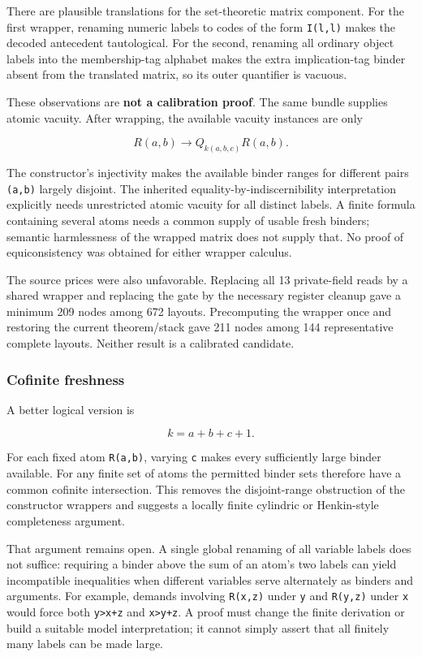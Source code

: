 \documentclass[
  11pt,
]{article}
\begin{document}
There are plausible translations for the set-theoretic matrix component.
For the first wrapper, renaming numeric labels to codes of the form
\texttt{I(l,l)} makes the decoded antecedent tautological. For the
second, renaming all ordinary object labels into the membership-tag
alphabet makes the extra implication-tag binder absent from the
translated matrix, so its outer quantifier is vacuous.

These observations are \textbf{not a calibration proof}. The same bundle
supplies atomic vacuity. After wrapping, the available vacuity instances
are only

\[
R(a,b)\to Q_{k(a,b,c)}R(a,b).
\]

The constructor's injectivity makes the available binder ranges for
different pairs \texttt{(a,b)} largely disjoint. The inherited
equality-by-indiscernibility interpretation explicitly needs
unrestricted atomic vacuity for all distinct labels. A finite formula
containing several atoms needs a common supply of usable fresh binders;
semantic harmlessness of the wrapped matrix does not supply that. No
proof of equiconsistency was obtained for either wrapper calculus.

The source prices were also unfavorable. Replacing all 13 private-field
reads by a shared wrapper and replacing the gate by the necessary
register cleanup gave a minimum 209 nodes among 672 layouts.
Precomputing the wrapper once and restoring the current theorem/stack
gave 211 nodes among 144 representative complete layouts. Neither result
is a calibrated candidate.

\hypertarget{cofinite-freshness}{%
\subsubsection{Cofinite freshness}\label{cofinite-freshness}}

A better logical version is

\[
k=a+b+c+1.
\]

For each fixed atom \texttt{R(a,b)}, varying \texttt{c} makes every
sufficiently large binder available. For any finite set of atoms the
permitted binder sets therefore have a common cofinite intersection.
This removes the disjoint-range obstruction of the constructor wrappers
and suggests a locally finite cylindric or Henkin-style completeness
argument.

That argument remains open. A single global renaming of all variable
labels does not suffice: requiring a binder above the sum of an atom's
two labels can yield incompatible inequalities when different variables
serve alternately as binders and arguments. For example, demands
involving \texttt{R(x,z)} under \texttt{y} and \texttt{R(y,z)} under
\texttt{x} would force both \texttt{y\textgreater{}x+z} and
\texttt{x\textgreater{}y+z}. A proof must change the finite derivation
or build a suitable model interpretation; it cannot simply assert that
all finitely many labels can be made large.
\end{document}

